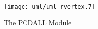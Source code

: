 \begin{figure}[htp]
  \begin{center}
    \texttt{[image: uml/uml-rvertex.7]}

    \caption{The PCDALL Module}
    \label{fig:sim-modules-helpers-pcdall}
  \end{center}
\end{figure}